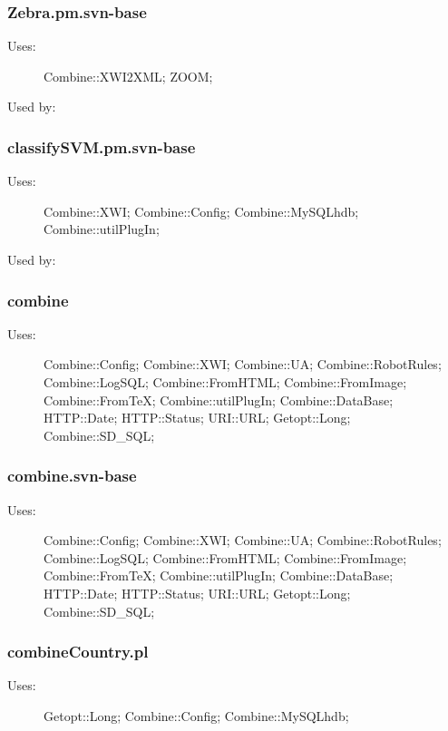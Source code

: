 \subsubsection{Zebra.pm.svn-base}
\begin{description}
\item[Uses:] Combine::XWI2XML; ZOOM; 

\item[Used by:] 

\end{description}
\subsubsection{classifySVM.pm.svn-base}
\begin{description}
\item[Uses:] Combine::XWI; Combine::Config; Combine::MySQLhdb; Combine::utilPlugIn; 

\item[Used by:] 

\end{description}
\subsubsection{combine}
\begin{description}
\item[Uses:] Combine::Config; Combine::XWI; Combine::UA; Combine::RobotRules; Combine::LogSQL; Combine::FromHTML; Combine::FromImage; Combine::FromTeX; Combine::utilPlugIn; Combine::DataBase; HTTP::Date; HTTP::Status; URI::URL; Getopt::Long; Combine::SD\_SQL; 

\end{description}
\subsubsection{combine.svn-base}
\begin{description}
\item[Uses:] Combine::Config; Combine::XWI; Combine::UA; Combine::RobotRules; Combine::LogSQL; Combine::FromHTML; Combine::FromImage; Combine::FromTeX; Combine::utilPlugIn; Combine::DataBase; HTTP::Date; HTTP::Status; URI::URL; Getopt::Long; Combine::SD\_SQL; 

\end{description}
\subsubsection{combineCountry.pl}
\begin{description}
\item[Uses:] Getopt::Long; Combine::Config; Combine::MySQLhdb; 

\end{description}
